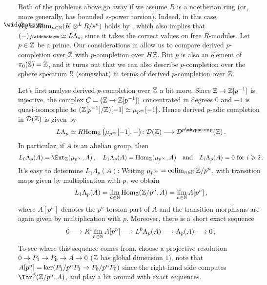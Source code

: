 Both of the problems above go away if we assume $R$ is a noetherian ring (or, more generally, has bounded $s$-power torsion). Indeed, in this case $\roof{K}_s\simeq R\!\limit_{n\in\IN}(K\otimes^LR/s^n)$ holds by \cite[]{stacks-project}, which also implies that $(-)_s^\complete\simeq L\Lambda_s$, since it takes the correct values on free $R$-modules.
\label{par:DerivedCompletionOverZVsCompletionOfSpectra}
Let $p\in \mathbb{Z}$ be a prime. Our considerations in  allow us to compare derived $p$-completion over $\mathbb{Z}$ with $p$-completion over $H\mathbb{Z}$. But $p$ is also an element of $\pi_0(\mathbb{S})=\mathbb{Z}$, and it turns out that we can also describe $p$-completion over the sphere spectrum $\mathbb{S}$ (somewhat) in terms of derived $p$-completion over $\mathbb{Z}$.

Let's first analyse derived $p$-completion over $\mathbb{Z}$ a bit more. Since $\IZ\morphism \IZ[p^{-1}]$ is injective, the complex $C=(\IZ\morphism \IZ[p^{-1}])$ concentrated in degrees $0$ and $-1$ is quasi-isomorphic to $(\mathbb{Z}[p^{-1}]/\mathbb{Z})[-1]\simeq \mu_{p^\infty}[-1]$. Hence derived $p$-adic completion in $\mathcal{D}(\mathbb{Z})$ is given by
\begin{equation*}
	L\Lambda_p\simeq R\!\Hom_\IZ\big(\mu_{p^\infty}[-1],-\big)\colon \Dd(\IZ)\morphism \Dd^{p\mhyph\mathrm{comp}}(\IZ)\,.
\end{equation*}
In particular, if $A$ is an abelian group, then
\begin{equation*}
	L_0\Lambda_p(A)=\Ext_\IZ(\mu_{p^\infty},A)\,,\quad L_1\Lambda_p(A)=\Hom_\IZ(\mu_{p^\infty},A)\quad\text{and}\quad L_i\Lambda_p(A)=0\text{ for }i\geq 2\,.
\end{equation*}
It's easy to determine $L_1\Lambda_p(A)$: Writing $\mu_{p^\infty}=\operatorname*{colim}_{n\in\mathbb{N}}\mathbb{Z}/p^n$, with transition maps given by multiplication with $p$, we obtain
\begin{equation*}
	L_1\Lambda_p(A)=\operatorname*{lim}_{n\in\mathbb{N}}\operatorname{Hom}_{\mathbb{Z}}(\mathbb{Z}/p^n,A)=\operatorname*{lim}_{n\in\mathbb{N}}A[p^n]\,,
\end{equation*}
where $A[p^n]$ denotes the $p^n$-torsion part of $A$ and the transition morphisms are again given by multiplication with $p$. Moreover, there is a short exact sequence
\begin{equation*}
	0\morphism R^1\!\limit_{n\in\IN} A[p^n]\morphism L^0\Lambda_p(A)\morphism \Lambda_p(A)\morphism 0\,,
\end{equation*}
To see where this sequence comes from, choose a projective resolution $0\morphism P_1\morphism P_0\morphism A\morphism 0$ ($\mathbb{Z}$ has global dimension $1$), note that $A[p^n]=\ker(P_1/p^nP_1\morphism P_0/p^nP_0)$ since the right-hand side computes $\Tor_1^\IZ(\IZ/p^n,A)$, and play a bit around with exact sequences.

